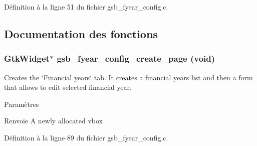 Définition à la ligne 51 du fichier gsb\_\-fyear\_\-config.c.



\subsection{Documentation des fonctions}
\subsubsection[{gsb\_\-fyear\_\-config\_\-create\_\-page}]{\setlength{\rightskip}{0pt plus 5cm}GtkWidget$\ast$ gsb\_\-fyear\_\-config\_\-create\_\-page (void)}\label{gsb__fyear__config_8c_a37421ef73d8d61900daa3c6c18846ed6}
Creates the \char`\"{}Financial years\char`\"{} tab. It creates a financial years list and then a form that allows to edit selected financial year.


\begin{DoxyParams}{Paramètres}
\item[{\em }]\end{DoxyParams}
\begin{DoxyReturn}{Renvoie}
A newly allocated vbox 
\end{DoxyReturn}


Définition à la ligne 89 du fichier gsb\_\-fyear\_\-config.c.

